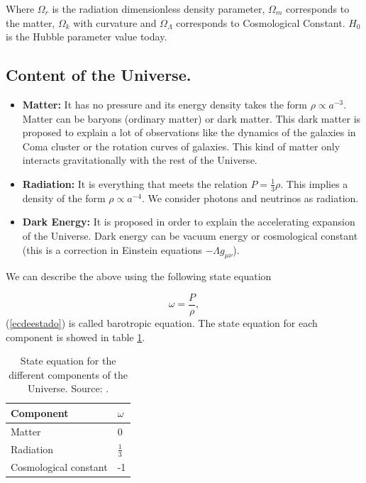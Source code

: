 \documentclass[onecolumn,           %
               showpacs,            %
               preprintnumbers,     %
               aps,                 %
               prl,          	    %
               letterpaper,             %
               superscriptaddress,      %
               nofootinbib,         %
               tightenlines,        %
               floats,floatfix      %
               ,usenatbib,
               ]{revtex4-1}
\begin{document}
Where $\Omega_r$ is the radiation dimensionless density parameter, $\Omega_m$ corresponds to the matter, $\Omega_k$ with curvature and $\Omega_{\Lambda}$ corresponds to Cosmological Constant. $H_0$ is the Hubble parameter value today.

\subsection{Content of the Universe.}

\begin{itemize}
	\item \textbf{Matter:} It has no pressure and its energy density takes the form $\rho \propto a^{-3}.$ Matter can be baryons (ordinary matter) or dark matter. This dark matter is proposed to explain a lot of observations like the dynamics of the galaxies in Coma cluster or the rotation curves of galaxies. This kind of matter only interacts gravitationally with the rest of the Universe.
	\item \textbf{Radiation:} It is everything that meets the relation $P = \frac{1}{3} \rho$. This implies a density of the form $\rho \propto a^{-4}$. We consider photons and neutrinos as radiation.
	\item \textbf{Dark Energy:} It is proposed in order to explain the accelerating expansion of the Universe. Dark energy can be vacuum energy or cosmological constant (this is a correction in Einstein equations $-\Lambda g_{\mu \nu}$).
\end{itemize}

We can describe the above using the following state equation

\begin{equation}
\label{ecdeestado}
\omega = \frac{P}{\rho},
\end{equation}
(\ref{ecdeestado}) is called barotropic equation. The state equation for each component is showed in table \ref{state}.

\begin{table} [htbp]
	\begin{center}
		\begin{tabular}{|l|l|}
			\hline
			Component & $\omega$\\
			\hline
			Matter & 0 \\
			\hline
			Radiation & $\frac{1}{3}$\\
			\hline
			Cosmological constant & -1 \\
			\hline
		\end{tabular}
		\caption{State equation for the different components of the Universe. Source: \cite{cambridge}.}
		\label{state}
	\end{center}
\end{table} 
\end{document}
